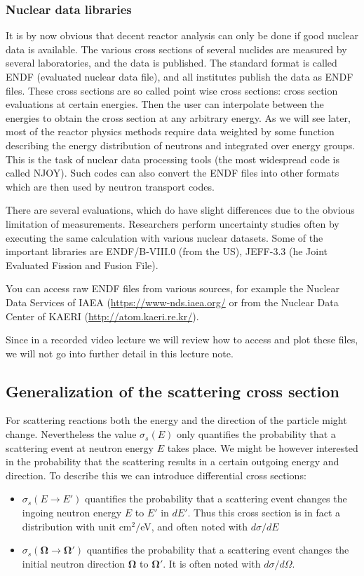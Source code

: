 \subsubsection{Nuclear data libraries}

It is by now obvious that decent reactor analysis can only be done if good nuclear data is available. The various cross sections of several nuclides are measured by several laboratories, and the data is published. The standard format is called ENDF (evaluated nuclear data file), and all institutes publish the data as ENDF files. These cross sections are so called point wise cross sections: cross section evaluations at certain energies. Then the user can interpolate between the energies to obtain the cross section at any arbitrary energy. As we will see later, most of the reactor physics methods require data weighted by some function describing the energy distribution of neutrons and integrated over energy groups. This is the task of nuclear data processing tools (the most widespread code is called NJOY). Such codes can also convert the ENDF files into other formats which are then used by neutron transport codes.

There are several evaluations, which do have slight differences due to the obvious limitation of measurements. Researchers perform uncertainty studies often by executing the same calculation with various nuclear datasets. Some of the important libraries are ENDF/B-VIII.0 (from the US), JEFF-3.3 (he Joint Evaluated Fission and Fusion File). 

You can access raw ENDF files from various sources, for example the Nuclear Data Services of IAEA (\url{https://www-nds.iaea.org/} or from the Nuclear Data Center of KAERI (\url{http://atom.kaeri.re.kr/}).

Since in a recorded video lecture we will review how to access and plot these files, we will not go into further detail in this lecture note. 

\subsection{Generalization of the scattering cross section}

For scattering reactions both the energy and the direction of the particle might change. Nevertheless the value $\sigma_s(E)$ only quantifies the probability that a scattering event at neutron energy $E$ takes place. We might be however interested in the probability that the scattering results in a certain outgoing energy and direction. To describe this we can introduce differential cross sections:
\begin{itemize}
\item $\sigma_s(E\rightarrow E')$ quantifies the probability that a scattering event changes the ingoing neutron energy $E$ to $E'$ in $dE'$. Thus this cross section is in fact a distribution with unit cm$^2/$eV, and often noted with $d\sigma/dE$
\item $\sigma_s(\mathbf{\Omega}\rightarrow \mathbf{\Omega}')$ quantifies the probability that a scattering event changes the initial neutron direction $\mathbf{\Omega}$ to $\mathbf{\Omega}'$. It is often noted with $d\sigma/d\Omega$.
\end{itemize}

